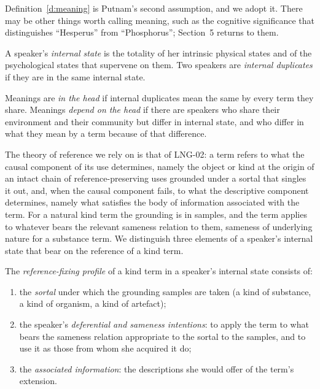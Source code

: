 \documentclass{situationist-preprint}
\begin{document}
Definition~\ref{d:meaning} is Putnam's second assumption, and we adopt it. There may be other things worth calling meaning, such as the cognitive significance that distinguishes \enquote{Hesperus} from \enquote{Phosphorus}; Section~5 returns to them.

\begin{definition}\label{d:internal}
A speaker's \emph{internal state} is the totality of her intrinsic physical states and of the psychological states that supervene on them. Two speakers are \emph{internal duplicates} if they are in the same internal state.
\end{definition}

\begin{definition}\label{d:inhead}
Meanings are \emph{in the head} if internal duplicates mean the same by every term they share. Meanings \emph{depend on the head} if there are speakers who share their environment and their community but differ in internal state, and who differ in what they mean by a term because of that difference.
\end{definition}

The theory of reference we rely on is that of LNG-02: a term refers to what the causal component of its use determines, namely the object or kind at the origin of an intact chain of reference-preserving uses grounded under a sortal that singles it out, and, when the causal component fails, to what the descriptive component determines, namely what satisfies the body of information associated with the term. For a natural kind term the grounding is in samples, and the term applies to whatever bears the relevant sameness relation to them, sameness of underlying nature for a substance term. We distinguish three elements of a speaker's internal state that bear on the reference of a kind term.

\begin{definition}\label{d:profile}
The \emph{reference-fixing profile} of a kind term in a speaker's internal state consists of:
\begin{enumerate}[label=(\alph*)]
\item the \emph{sortal} under which the grounding samples are taken (a kind of substance, a kind of organism, a kind of artefact);
\item the speaker's \emph{deferential and sameness intentions}: to apply the term to what bears the sameness relation appropriate to the sortal to the samples, and to use it as those from whom she acquired it do;
\item the \emph{associated information}: the descriptions she would offer of the term's extension.
\end{enumerate}
\end{definition}
\end{document}
